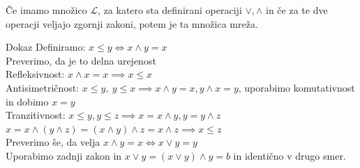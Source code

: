 \documentclass[slovene]{beamer}
\begin{document}
\begin{frame}
\begin{theorem}
Če imamo množico $\mathcal{L}$, za katero sta definirani operaciji $\lor, \land$ in če za te dve operacji veljajo zgornji zakoni, potem je ta množica mreža.
\end{theorem}
\end{frame}

\begin{frame}

\begin{block}{Dokaz}
\centering Definiramo: $x \leq y \iff x \land y = x$ \\ Preverimo, da je to delna urejenost \\ \pause 
Refleksivnost: $x \land x = x \implies x \leq x$\\ \pause
Antisimetričnost: $x \leq y, \ y \leq x \implies x \land y = x, y \land x = y$, uporabimo komutativnost in dobimo $x = y$\\ \pause
Tranzitivnost:  $x \leq y, y \leq z \implies x = x \land y, y = y \land z$ \\
$x = x \land (y \land z) = (x \land y) \land z = x \land z \implies x \leq z$ \\ \pause
Preverimo še, da velja $x \land y = x \iff x \lor y = y$\\ \pause
Uporabimo zadnji zakon in $x \lor y = (x \lor y) \land y = b$ in identično v drugo smer.
\end{block}


\end{frame}
\end{document}
